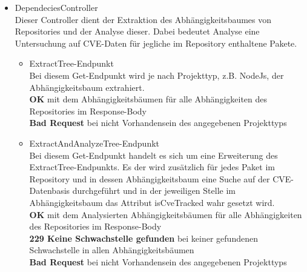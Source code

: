 \begin{itemize}
        \item DependeciesController \label{api_controller:two} \\
            Dieser Controller dient der Extraktion des Abhängigkeitsbaumes von Repositories und der Analyse dieser.
            Dabei bedeutet Analyse eine Untersuchung auf \ac{CVE}-Daten für jegliche im Repository enthaltene Pakete.
            \begin{itemize}
                \item ExtractTree-Endpunkt \\
                    Bei diesem Get-Endpunkt wird je nach Projekttyp, z.B. NodeJs, der Abhängigkeitsbaum extrahiert.
                    \\
                    \textbf{OK} mit dem Abhängigkeitsbäumen für alle Abhängigkeiten des Repositories im Response-Body
                    \\
                    \textbf{Bad Request} bei nicht Vorhandensein des angegebenen Projekttyps
                \item ExtractAndAnalyzeTree-Endpunkt \\
                    Bei diesem Get-Endpunkt handelt es sich um eine Erweiterung des ExtractTree-Endpunkts.
                    Es der wird zusätzlich für jedes Paket im Repository und in dessen Abhängigkeitsbaum eine Suche auf der CVE-Datenbasis durchgeführt und in der jeweiligen Stelle im Abhängigkeitsbaum das Attribut isCveTracked wahr gesetzt wird.
                    \\
                    \textbf{OK} mit dem Analysierten Abhängigkeitsbäumen für alle Abhängigkeiten des Repositories im Response-Body
                    \\
                    \textbf{229 Keine Schwachstelle gefunden} bei keiner gefundenen Schwachstelle in allen Abhängigkeitsbäumen
                    \\
                    \textbf{Bad Request} bei nicht Vorhandensein des angegebenen Projekttyps
            \end{itemize}


\end{itemize}
